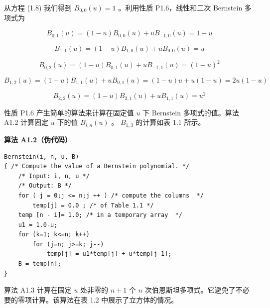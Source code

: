 \documentclass[../main.tex]{subfiles}
\begin{document}
从方程 (1.8) 我们得到 \({B}_{0,0}\left( u\right)  = 1\) 。利用性质 P1.6，线性和二次 Bernstein 多项式为

\[
{B}_{0,1}\left( u\right)  = \left( {1 - u}\right) {B}_{0,0}\left( u\right)  + u{B}_{-1,0}\left( u\right)  = 1 - u
\]

\[
{B}_{1,1}\left( u\right)  = \left( {1 - u}\right) {B}_{1,0}\left( u\right)  + u{B}_{0,0}\left( u\right)  = u
\]

\[
{B}_{0,2}\left( u\right)  = \left( {1 - u}\right) {B}_{0,1}\left( u\right)  + u{B}_{-1,1}\left( u\right)  = {\left( 1 - u\right) }^{2}
\]

\[
{B}_{1,2}\left( u\right)  = \left( {1 - u}\right) {B}_{1,1}\left( u\right)  + u{B}_{0,1}\left( u\right)  = \left( {1 - u}\right) u + u\left( {1 - u}\right)  = {2u}\left( {1 - u}\right)
\]

\[
{B}_{2,2}\left( u\right)  = \left( {1 - u}\right) {B}_{2,1}\left( u\right)  + u{B}_{1,1}\left( u\right)  = {u}^{2}
\]



性质 P1.6 产生简单的算法来计算在固定值 \(u\) 下 Bernstein 多项式的值。算法 A1.2 计算固定 \(u\) 下的值 \({B}_{i,n}\left( u\right)\) 。 \({B}_{1,3}\) 的计算如表 1.1 所示。

\par\medskip\noindent\textbf{算法 A1.2（伪代码）}\par
\begin{verbatim}
Bernstein(i, n, u, B)
{ /* Compute the value of a Bernstein polynomial. */
    /* Input: i, n, u */
    /* Output: B */
    for ( j = 0;j <= n;j ++ ) /* compute the columns  */
        temp[j] = 0.0 ; /* of Table 1.1 */
    temp [n - i]= 1.0; /* in a temporary array  */
    u1 = 1.0-u;
    for (k=1; k<=n; k++)
        for (j=n; j>=k; j--)
            temp[j] = u1*temp[j] + u*temp[j-1];
    B = temp[n];
}
\end{verbatim}

\begin{center}
\begin{minipage}{12cm}
\centering
\captionsetup{font=small,skip=6pt,justification=centering}
\smallskip
{}
\end{minipage}
\end{center}

算法 A1.3 计算在固定 \(u\) 处非零的 \(n+1\) 个 \(n\) 次伯恩斯坦多项式。它避免了不必要的零项计算。该算法在表 1.2 中展示了立方体的情况。
\end{document}
